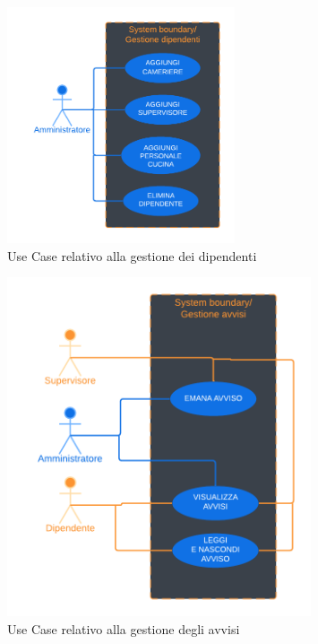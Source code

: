         \begin{figure}[H]
            \centering
            \includegraphics[width=0.6\textwidth]{assets/diagrammi/Use-Case/Gestione dipendenti.png}
            \caption{Use Case relativo alla gestione dei dipendenti}
            \label{fig:ucdWorkersMgmt}
        \end{figure}

        \begin{figure}[H]
            \centering
            \includegraphics[width=0.8\textwidth]{assets/diagrammi/Use-Case/Gestione avvisi.png}
            \caption{Use Case relativo alla gestione degli avvisi}
            \label{fig:ucdAdvMgmt}
        \end{figure}
\newpage